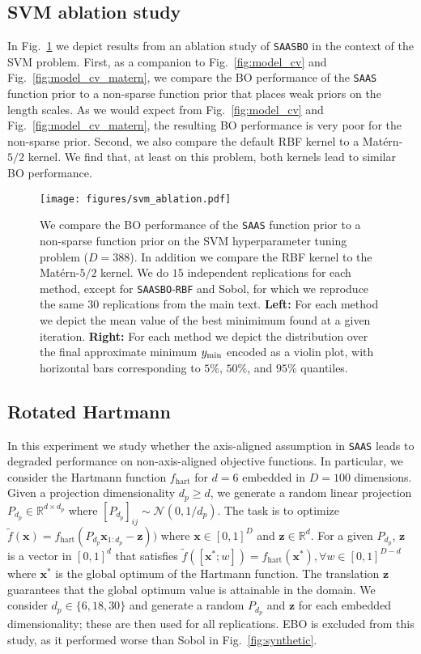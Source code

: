 \documentclass[accepted]{uai2021} %
\newcommand{\algoname}{{\texttt {SAASBO}}}
\newcommand{\priorname}{{\texttt {SAAS}}}
\newcommand{\bx}{\mathbf{x}}
\newcommand{\bz}{\mathbf{z}}
\begin{document}
\subsection{SVM ablation study}
In Fig.~\ref{fig:svm_ablation} we depict results from an ablation study of \algoname{} in the context of the SVM problem.
First, as a companion to Fig.~\ref{fig:model_cv} and Fig.~\ref{fig:model_cv_matern}, we compare the BO performance
of the \priorname{} function prior to a non-sparse function prior that places weak priors on the length scales.
As we would expect from Fig.~\ref{fig:model_cv} and Fig.~\ref{fig:model_cv_matern}, the resulting BO performance is
very poor for the non-sparse prior.
Second, we also compare the default RBF kernel to a Mat\'ern-$5/2$ kernel. We find that, at least on this problem,
both kernels lead to similar BO performance.
\begin{figure}[!ht]
  \centering
  \texttt{[image: figures/svm\_ablation.pdf]}
    \caption{We compare the BO performance of the \priorname{} function prior to a non-sparse function prior
             on the SVM hyperparameter tuning problem ($D=388$). In addition we compare the RBF kernel
             to the Mat\'ern-$5/2$ kernel.
             We do $15$ independent replications for each method, except for \algoname-\texttt{RBF} and Sobol,
             for which we reproduce the same $30$ replications from the main text.
    {\bf Left:} For each method we depict the mean value of the best minimimum found at a given iteration.
    {\bf Right:} For each method we depict the distribution over the final approximate minimum $y_{\rm min}$ encoded as
    a violin plot, with horizontal bars corresponding to $5$\%, $50$\%, and $95$\% quantiles.
    }
    \label{fig:svm_ablation}
\end{figure}


\subsection{Rotated Hartmann}
\label{sec:rotated}
In this experiment we study whether the axis-aligned assumption in \priorname{} leads to degraded performance
 on non-axis-aligned objective functions.
In particular, we consider the Hartmann function $f_{\text{hart}}$ for $d=6$ embedded in $D=100$ dimensions.
Given a projection dimensionality $d_p \geq d$, we generate a random linear projection $P_{d_p} \in \mathbb{R}^{d \times d_p}$ where $[P_{d_p}]_{ij} \sim \mathcal{N}(0, 1 / d_p)$.
The task is to optimize $\tilde{f}(\bx) = f_{\text{hart}}(P_{d_p} \bx_{1:d_p} - \bz))$ where $\bx \in [0, 1]^D$ and $\bz \in \mathbb{R}^d$.
For a given $P_{d_p}$, $\bz$ is a vector in $[0, 1]^{d}$ that satisfies $\tilde{f}([\bx^*; w]) = f_{\text{hart}}(\bx^*), \forall w \in [0, 1]^{D - d}$ where $\bx^*$ is the global optimum of the Hartmann function.
The translation $\bz$ guarantees that the global optimum value is attainable in the domain.
We consider $d_p \in \{ 6, 18, 30 \}$ and generate a random $P_{d_p}$ and $\bz$ for each embedded dimensionality;
these are then used for all replications.
EBO is excluded from this study, as it performed worse than Sobol in Fig.~\ref{fig:synthetic}.
\end{document}
